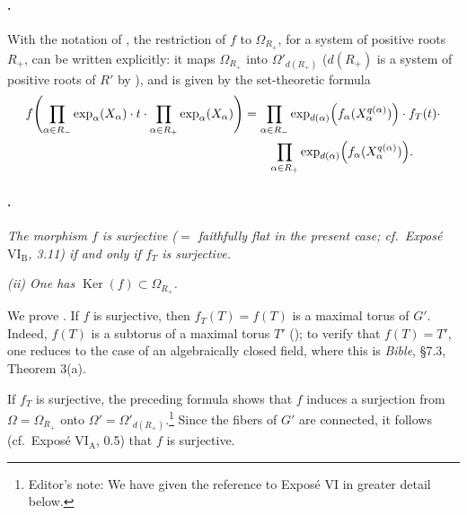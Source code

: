 \paragraph{.}
With the notation of , the restriction of \(f\) to
\(\Omega_{R_+}\), for a system of positive roots \(R_+\), can be
written explicitly: it maps \(\Omega_{R_+}\) into
\(\Omega'_{d(R_+)}\) \textup{(\(d(R_+)\) is a system of positive
roots of \(R'\) by )}, and is given by the
set-theoretic formula
\[
\begin{aligned}
  f\Biggl(
    \prod_{\alpha\in R_-}\exp_\alpha(X_\alpha)
    \mathbin{\cdot}t\mathbin{\cdot}
    \prod_{\alpha\in R_+}\exp_\alpha(X_\alpha)
  \Biggr)
  &=
  \prod_{\alpha\in R_-}
    \exp_{d(\alpha)}
    \Bigl(f_\alpha(X_\alpha^{q(\alpha)})\Bigr)
  \mathbin{\cdot}f_T(t)\mathbin{\cdot}\\
  &\qquad
  \prod_{\alpha\in R_+}
    \exp_{d(\alpha)}
    \Bigl(f_\alpha(X_\alpha^{q(\alpha)})\Bigr).
\end{aligned}
\]

\paragraph{.}
\textit{\textup{} The morphism \(f\) is surjective
\textup{(\(=\) faithfully flat in the present case; cf.\
Exposé \(\mathrm{VI_B}\), 3.11)} if and only if \(f_T\) is
surjective.}

\textit{\textup{(ii)} One has
\(\operatorname{Ker}(f)\subset\Omega_{R_+}\).}

We prove \textup{}. If \(f\) is surjective, then
\(f_T(T)=f(T)\) is a maximal torus of \(G'\). Indeed, \(f(T)\) is
a subtorus of a maximal torus \(T'\) \textup{()}; to
verify that \(f(T)=T'\), one reduces to the case of an algebraically
closed field, where this is \emph{Bible}, \S7.3, Theorem 3\textup{(a)}.

If \(f_T\) is surjective, the preceding formula shows that \(f\)
induces a surjection from \(\Omega=\Omega_{R_+}\) onto
\(\Omega'=\Omega'_{d(R_+)}\).\footnote{Editor's note: We have given
the reference to Exposé VI in greater detail below.} Since the fibers
of \(G'\) are connected, it follows \textup{(cf.\ Exposé
\(\mathrm{VI_A}\), 0.5)} that \(f\) is surjective.

